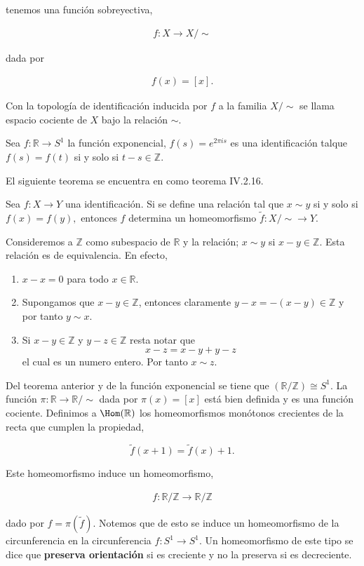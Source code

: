 tenemos una función sobreyectiva,

\begin{align*}
f:X \to X / \sim
\end{align*}

dada por

\begin{align*}
f(x)=[x].
\end{align*}

\begin{df}
Con la topología de identificación inducida por $f$ a la familia $X/ \sim$ se llama espacio cociente de $X$ bajo la relación $\sim$. 
\end{df}

\begin{ej}
Sea $f: \mathbb{R} \to S^1$ la función exponencial, $f(s)=e^{2\pi i s}$ es una identificación talque $f(s)=f(t)$ si y solo si $t-s \in \mathbb{Z}$.
\end{ej}

El siguiente teorema se encuentra en \cite{top_prieto} como teorema IV.2.16.

\begin{te} 
Sea $f:X \to Y$ una identificación. Si se define una relación tal que $x \sim y$ si y solo si $f(x)=f(y),$ entonces $f$ determina un homeomorfismo $\tilde{f}:X/ \sim \to Y.$
\end{te}


\begin{ej}\label{ej:Cir_un_coc}
Consideremos a $\mathbb{Z}$ como subespacio de $\mathbb{R}$ y la relación; $x \sim y$ si $x-y \in \mathbb{Z}$. Esta relación es de equivalencia. En efecto, 

\begin{enumerate}
	\item $x-x=0 $ para todo $x \in \mathbb{R}$.
	\item Supongamos que $x-y \in \mathbb{Z}$, entonces claramente $y-x=-(x-y) \in \mathbb{Z}$ y por tanto $y \sim x$.
	\item Si $x-y \in \mathbb{Z}$ y $y-z \in \mathbb{Z}$ resta notar que $$x-z=x-y+y-z$$
el cual es un numero entero. Por tanto $x \sim z$.
	\end{enumerate}


Del teorema anterior y de la función exponencial se tiene que $(\mathbb{R}/\mathbb{Z}) \cong S^1.$ La función  $\pi: \mathbb{R} \to \mathbb{R}/ \sim$ dada por $\pi (x)=[x]$ está bien definida y es una función cociente. Definimos a $\Hom(\mathbb{R})$ los homeomorfismos monótonos crecientes de la recta que cumplen la propiedad, 

$$\tilde{f}(x+1)= \tilde{f}(x)+1.$$

Este homeomorfismo induce un homeomorfismo,

\begin{align*}
f:\mathbb{R}/ \mathbb{Z} \to  \mathbb{R}/ \mathbb{Z}
\end{align*}
 
dado por $f=\pi(\tilde{f}).$ Notemos que de esto se induce un homeomorfismo de la circunferencia en la circunferencia $f:S^1 \to S^1$. Un homeomorfismo de este tipo se dice que \textbf{preserva orientación} si es creciente y no la preserva si es decreciente. 
\end{ej}

